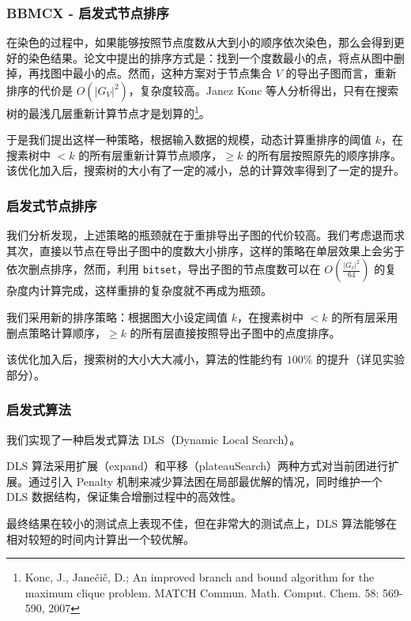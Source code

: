 \documentclass[slidestop,compress,mathserif]{beamer}
\begin{document}
	\begin{frame}
		\frametitle{BBMCX - 启发式节点排序}
	
		在染色的过程中，如果能够按照节点度数从大到小的顺序依次染色，那么会得到更好的染色结果。论文中提出的排序方式是：找到一个度数最小的点，将点从图中删掉，再找图中最小的点。然而，这种方案对于节点集合 $V$ 的导出子图而言，重新排序的代价是 $O(|G_V|^2)$，复杂度较高。Janez Konc 等人分析得出，只有在搜索树的最浅几层重新计算节点才是划算的\footnote{Konc, J., Janečič, D.; An improved branch and bound algorithm for the maximum clique problem. MATCH Commun. Math. Comput. Chem. 58: 569-590, 2007}。
		
		于是我们提出这样一种策略，根据输入数据的规模，动态计算重排序的阈值 $k$，在搜素树中 $< k$ 的所有层重新计算节点顺序，$\ge k$ 的所有层按照原先的顺序排序。该优化加入后，搜索树的大小有了一定的减小，总的计算效率得到了一定的提升。
	
	\end{frame}
	
	\begin{frame}
	\frametitle{启发式节点排序}
		我们分析发现，上述策略的瓶颈就在于重排导出子图的代价较高。我们考虑退而求其次，直接以节点在导出子图中的度数大小排序，这样的策略在单层效果上会劣于依次删点排序，然而，利用 \texttt{bitset}，导出子图的节点度数可以在 $O(\frac {|G_v|^2} {64})$ 的复杂度内计算完成，这样重排的复杂度就不再成为瓶颈。
		
		我们采用新的排序策略：根据图大小设定阈值 $k$，在搜素树中 $< k$ 的所有层采用删点策略计算顺序，$\ge k$ 的所有层直接按照导出子图中的点度排序。
		
		该优化加入后，搜索树的大小大大减小，算法的性能约有 $100\%$ 的提升（详见实验部分）。
	\end{frame}
	
	\begin{frame}
		\frametitle {启发式算法}
			我们实现了一种启发式算法 DLS（Dynamic Local Search）。
			
			DLS 算法采用扩展（expand）和平移（plateauSearch）两种方式对当前团进行扩展。通过引入 Penalty 机制来减少算法困在局部最优解的情况，同时维护一个 DLS 数据结构，保证集合增删过程中的高效性。
			
			最终结果在较小的测试点上表现不佳，但在非常大的测试点上，DLS 算法能够在相对较短的时间内计算出一个较优解。
		
	\end{frame}
\end{document}
